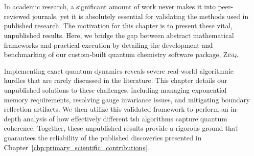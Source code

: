 \chapter{\foldertotitle}\label{chp:supporting_numerical_studies}
In academic research, a significant amount of work never makes it into peer-reviewed journals, yet it is absolutely essential for validating the methods used in published research. The motivation for this chapter is to present these vital, unpublished results. Here, we bridge the gap between abstract mathematical frameworks and practical execution by detailing the development and benchmarking of our custom-built quantum chemistry software package, \textsc{Zinq}.\supercite{10.5281/zenodo.18386143}

Implementing exact quantum dynamics reveals severe real-world algorithmic hurdles that are rarely discussed in the literature. This chapter details our unpublished solutions to these challenges, including managing exponential memory requirements, resolving gauge invariance issues, and mitigating boundary reflection artifacts. We then utilize this validated framework to perform an in-depth analysis of how effectively different \acrfull{tsh} algorithms capture quantum coherence. Together, these unpublished results provide a rigorous ground that guarantees the reliability of the published discoveries presented in Chapter~\ref{chp:primary_scientific_contributions}.
